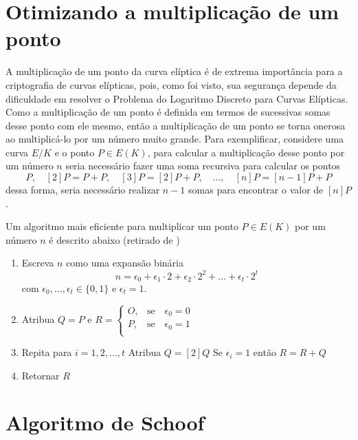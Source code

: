 \begin{apendicesenv}

\partapendices

\chapter{Otimizando a multiplicação de um ponto}

A multiplicação de um ponto da curva elíptica é de extrema importância para a criptografia de curvas elípticas, pois, como foi visto, sua segurança depende da dificuldade em resolver o Problema do Logaritmo Discreto para Curvas Elípticas. Como a multiplicação de um ponto é definida em termos de sucessivas somas desse ponto com ele mesmo, então a multiplicação de um ponto se torna onerosa ao multiplicá-lo por um número muito grande. Para exemplificar, considere uma curva $E/K$ e o ponto $P \in E(K)$, para calcular a multiplicação desse ponto por um número $n$ seria necessário fazer uma soma recursiva para calcular os pontos
$$
P,\quad [2]P = P + P,\quad [3]P = [2]P + P,\quad \dots,\quad [n]P = [n-1]P + P
$$
dessa forma, seria necessário realizar $n-1$ somas para encontrar o valor de $[n]P$. \cite{Silverman:2009}

Um algoritmo mais eficiente para multiplicar um ponto $P \in E(K)$ por um número $n$ é descrito abaixo (retirado de \cite{Silverman:2009})

\begin{enumerate}
  \item Escreva $n$ como uma expansão binária $$n = \epsilon_0 + \epsilon_1 \cdot 2 + \epsilon_2 \cdot 2^2 + \dots + \epsilon_t \cdot 2^t$$
com $\epsilon_0, \dots, \epsilon_t \in \{0, 1\}$ e $\epsilon_t = 1$.
  \item Atribua $Q = P$ e
	$
	R = \begin{cases}
	O, &\mbox{se} \quad\epsilon_0 = 0\\
	P, &\mbox{se} \quad\epsilon_0 = 1\\
	\end{cases}
	$
  \item Repita para $i = 1, 2, \dots, t$
    \subitem Atribua $Q = [2]Q$
    \subitem Se $\epsilon_i = 1$ então $R = R + Q$
  \item Retornar $R$
\end{enumerate}

\chapter{Algoritmo de Schoof} \label{SchoofAlg}


\end{apendicesenv}
